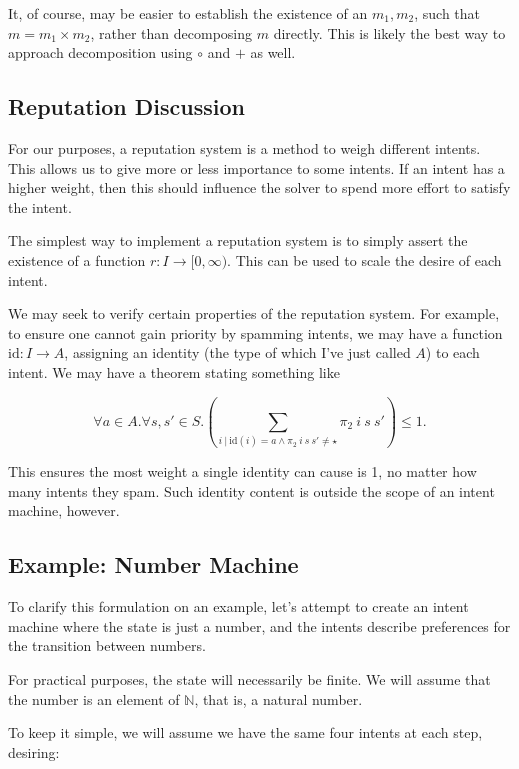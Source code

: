 It, of course, may be easier to establish the existence of an $m_1, m_2$, such that $m = m_1 \times m_2$, rather than decomposing $m$ directly. This is likely the best way to approach decomposition using $\circ$ and $+$ as well.

\subsection{Reputation Discussion}

For our purposes, a reputation system is a method to weigh different intents. This allows us to give more or less importance to some intents. If an intent has a higher weight, then this should influence the solver to spend more effort to satisfy the intent.

The simplest way to implement a reputation system is to simply assert the existence of a function $r : I \rightarrow [0, \infty)$. This can be used to scale the desire of each intent.

We may seek to verify certain properties of the reputation system. For example, to ensure one cannot gain priority by spamming intents, we may have a function $\text{id} : I \rightarrow A$, assigning an identity (the type of which I've just called $A$) to each intent. We may have a theorem stating something like

\begin{equation}
    \forall a \in A. \forall s, s' \in S. \left( \sum_{i\ |\ \text{id}(i) = a \wedge \pi_2\ i\ s\ s' \neq \star} \pi_2\ i\ s\ s' \right) \leq 1.
\end{equation}

This ensures the most weight a single identity can cause is 1, no matter how many intents they spam. Such identity content is outside the scope of an intent machine, however.

\subsection{Example: Number Machine}

To clarify this formulation on an example, let's attempt to create an intent machine where the state is just a number, and the intents describe preferences for the transition between numbers.

For practical purposes, the state will necessarily be finite. We will assume that the number is an element of $\mathbb{N}$, that is, a natural number.

To keep it simple, we will assume we have the same four intents at each step, desiring:

